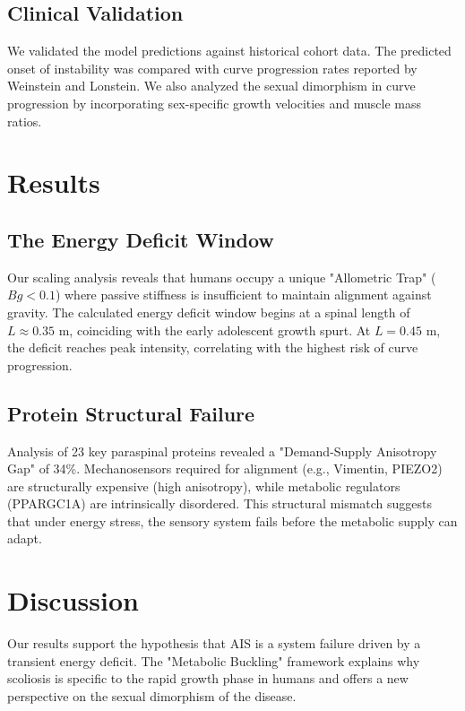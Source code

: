 \documentclass[11pt]{article}
\begin{document}
\subsection*{Clinical Validation}
We validated the model predictions against historical cohort data. The predicted onset of instability was compared with curve progression rates reported by Weinstein\cite{weinstein1983} and Lonstein\cite{lonstein1984}. We also analyzed the sexual dimorphism in curve progression by incorporating sex-specific growth velocities and muscle mass ratios.

\section*{Results}

\subsection*{The Energy Deficit Window}
Our scaling analysis reveals that humans occupy a unique "Allometric Trap" ($Bg < 0.1$) where passive stiffness is insufficient to maintain alignment against gravity. The calculated energy deficit window begins at a spinal length of $L \approx 0.35$ m, coinciding with the early adolescent growth spurt. At $L=0.45$ m, the deficit reaches peak intensity, correlating with the highest risk of curve progression.

\subsection*{Protein Structural Failure}
Analysis of 23 key paraspinal proteins revealed a "Demand-Supply Anisotropy Gap" of 34\%. Mechanosensors required for alignment (e.g., Vimentin, PIEZO2) are structurally expensive (high anisotropy), while metabolic regulators (PPARGC1A) are intrinsically disordered. This structural mismatch suggests that under energy stress, the sensory system fails before the metabolic supply can adapt.

\section*{Discussion}

Our results support the hypothesis that AIS is a system failure driven by a transient energy deficit. The "Metabolic Buckling" framework explains why scoliosis is specific to the rapid growth phase in humans and offers a new perspective on the sexual dimorphism of the disease.
\end{document}
